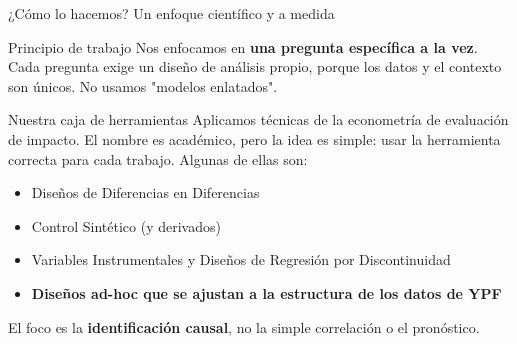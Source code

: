 \documentclass[aspectratio=169]{beamer}
\newcommand{\highlight}[1]{\textcolor{YPFBlue}{\textbf{#1}}}
\newcommand{\soft}[1]{\textcolor{SoftGray}{#1}}
\begin{document}
\begin{frame}{¿Cómo lo hacemos? Un enfoque científico y a medida}

\begin{block}{Principio de trabajo}
\justifying
Nos enfocamos en \highlight{una pregunta específica a la vez}. Cada pregunta exige un diseño de análisis propio, porque los datos y el contexto son únicos. No usamos "modelos enlatados".
\end{block}

\begin{block}{Nuestra caja de herramientas}
\justifying
Aplicamos técnicas de la econometría de evaluación de impacto. El nombre es académico, pero la idea es simple: usar la herramienta correcta para cada trabajo. Algunas de ellas son:
\begin{itemize}
    \item Diseños de Diferencias en Diferencias
    \item Control Sintético (y derivados)
    \item Variables Instrumentales y Diseños de Regresión por Discontinuidad
    \item \highlight{Diseños ad-hoc que se ajustan a la estructura de los datos de YPF}
\end{itemize}
\end{block}

\vfill
\begin{center}
\Large
\soft{El foco es la} \highlight{identificación causal}, \soft{no la simple correlación o el pronóstico.}
\end{center}
\end{frame}
\end{document}
